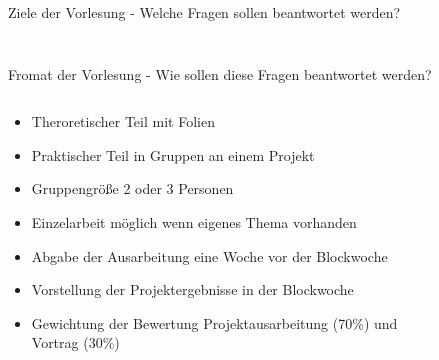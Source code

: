 \documentclass[aspectratio=1610, xcolor=dvipsnames, 9pt]{beamer}
\begin{document}
\begin{frame}{Ziele der Vorlesung - Welche Fragen sollen beantwortet werden?}
\begin{columns}
\begin{column}{0.3\textwidth}
\begin{figure}
             [\url{https://xkcd.com/2451/}]
 \end{figure}
    \end{column}
  \end{columns}
\end{frame}

\begin{frame}{Fromat der Vorlesung - Wie sollen diese Fragen beantwortet werden?}
  \begin{columns}
    \begin{column}{0.69\textwidth}
      \begin{itemize}
        \item Theroretischer Teil mit Folien \newline
        \item Praktischer Teil in Gruppen an einem Projekt  \newline
        \item Gruppengröße 2 oder 3 Personen  \newline
        \item Einzelarbeit möglich wenn eigenes Thema vorhanden \newline
        \item Abgabe der Ausarbeitung eine Woche vor der Blockwoche \newline
        \item Vorstellung der Projektergebnisse in der Blockwoche \newline
        \item Gewichtung der Bewertung Projektausarbeitung (70\%) und Vortrag (30\%)
      \end{itemize}
    \end{column}
    \begin{column}{0.3\textwidth}
 \begin{figure}
 \centering

\end{figure}
\end{column}
\end{columns}
\end{frame}
\end{document}
